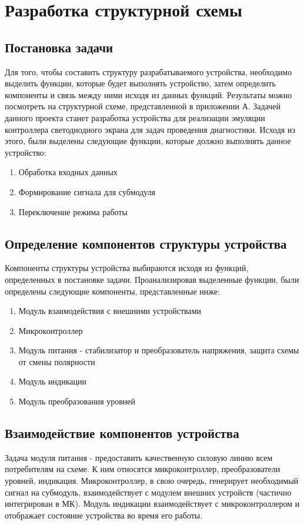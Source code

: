 \section{Разработка структурной схемы}
\label{sec:struct}

\subsection{Постановка задачи}

Для того, чтобы составить структуру разрабатываемого устройства, необходимо выделить функции, которые будет выполнять устройство, затем определить компоненты и связь между ними исходя из данных функций. Результаты можно посмотреть на структурной схеме, представленной в приложении А. 
Задачей данного проекта станет разработка устройства для реализации эмуляции контроллера светодиодного экрана для задач проведения диагностики. Исходя из этого, были выделены следующие функции, которые должно выполнять данное устройство: 
\begin{enumerate}
    \item Обработка входных данных
    \item Формирование сигнала для субмодуля
    \item Переключение режима работы
\end{enumerate}

\subsection{Определение компонентов структуры устройства}

Компоненты структуры устройства выбираются исходя из функций, определенных в постановке задачи. Проанализировав выделенные функции, были определены следующие компоненты, представленные ниже:
\begin{enumerate}
    \item Модуль взаимодействия с внешними устройствами
    \item Микроконтроллер
    \item Модуль питания - стабилизатор и преобразователь напряжения, защита схемы от смены полярности
    \item Модуль индикации
    \item Модуль преобразования уровней
\end{enumerate}

\subsection{Взаимодействие компонентов устройства}

Задача модуля питания - предоставить качественную силовую линию всем потребителям на схеме. К ним относятся микроконтроллер, преобразователи уровней, индикация. Микроконтроллер, в свою очередь, генерирует необходимый сигнал на субмодуль, взаимодействует с модулем внешних устройств (частично интегрирован в МК). Модуль индикации взаимодействует с микроконтроллером и отображает состояние устройства во время его работы.